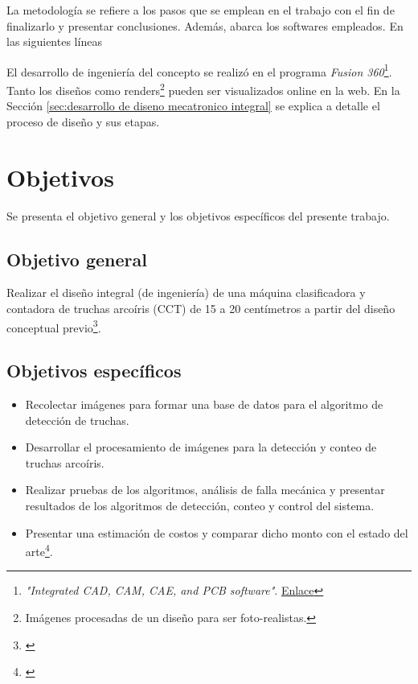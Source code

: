 La metodología se refiere a los pasos que se emplean en el trabajo con el fin de finalizarlo y presentar conclusiones. Además, abarca los softwares empleados. En las siguientes líneas

El desarrollo de ingeniería del concepto se realizó en el programa \textit{Fusion 360}\footnote{\textit{"Integrated CAD, CAM, CAE, and PCB software"}. \href{https://www.autodesk.com/products/fusion-360/overview}{Enlace}}. Tanto los diseños como renders\footnote{Imágenes procesadas de un diseño para ser foto-realistas.} pueden ser visualizados online en la web. En la Sección \ref{sec:desarrollo de diseno mecatronico integral} se explica a detalle el proceso de diseño y sus etapas.

\section{Objetivos}

Se presenta el objetivo general y los objetivos específicos del presente trabajo.

\subsection{Objetivo general}

Realizar el diseño integral (de ingeniería) de una máquina clasificadora y contadora de truchas arcoíris (CCT) de 15 a 20 centímetros a partir del diseño conceptual previo\footnote{\cite{DiazVergara2020}}.

\subsection{Objetivos específicos}

\begin{itemize}
	\item Recolectar imágenes para formar una base de datos para el algoritmo de detección de truchas. 
	\item Desarrollar el procesamiento de imágenes para la detección y conteo de truchas arcoíris.
	\item Realizar pruebas de los algoritmos, análisis de falla mecánica y presentar resultados de los algoritmos de detección, conteo y control del sistema.
	\item Presentar una estimación de costos y comparar dicho monto con el estado del arte\footnote{\cite{DiazVergara2020}}.	
\end{itemize}


